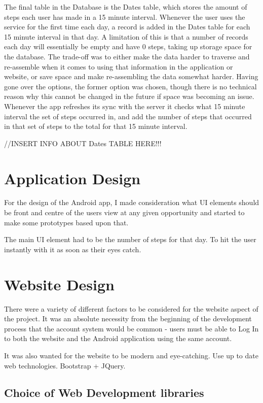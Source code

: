 \documentclass{l4proj}
\begin{document}
The final table in the Database is the Dates table, which stores the amount of steps each user has made in a 15 minute interval. Whenever the user uses the service for the first time each day, a record is added in the Dates table for each 15 minute interval in that day. A limitation of this is that a number of records each day will essentially be empty and have 0 steps, taking up storage space for the database. The trade-off was to either make the data harder to traverse and re-assemble when it comes to using that information in the application or website, or save space and make re-assembling the data somewhat harder. Having gone over the options, the former option was chosen, though there is no technical reason why this cannot be changed in the future if space was becoming an issue. Whenever the app refreshes its sync with the server it checks what 15 minute interval the set of steps occurred in, and add the number of steps that occurred in that set of steps to the total for that 15 minute interval.

//INSERT INFO ABOUT Dates TABLE HERE!!!

\section{Application Design}

For the design of the Android app, I made consideration what UI elements should be front and centre of the users view at any given opportunity and started to make some prototypes based upon that.

The main UI element had to be the number of steps for that day. To hit the user instantly with it as soon as their eyes catch.

\section{Website Design}

There were a variety of different factors to be considered for the website aspect of the project. It was an absolute necessity from the beginning of the development process that the account system would be common - users must be able to Log In to both the website and the Android application using the same account.

It was also wanted for the website to be modern and eye-catching. Use up to date web technologies. Bootstrap + JQuery.

\subsection{Choice of Web Development libraries}
\end{document}
